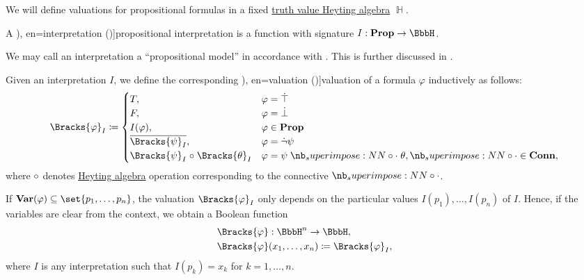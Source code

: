 \begin{definition}\label{def:propositional_valuation}\mimprovised
  We will define valuations for propositional formulas in a fixed \hyperref[con:truth_value_algebra]{truth value Heyting algebra} \( \BbbH \).

  \begin{thmenum}
     A \term[ru=интерпретация (\cite[17]{Герасимов2011Вычислимость}), en=interpretation (\cite[10]{Smullyan1995FOL})]{propositional interpretation} is a function with signature \( I: \op*{Prop} \to \BbbH \).

    We may call an interpretation a \enquote{propositional model} in accordance with . This is further discussed in .

     Given an interpretation \( I \), we define the corresponding \term[ru=значение истинности (формулы) (\cite[8]{Эдельман1975Логика}), en=valuation (\cite[10]{Smullyan1995FOL})]{valuation} of a formula \( \varphi \) inductively as follows:
    \begin{equation}\label{eq:def:propositional_valuation/formula_valuation}
      \Bracks{\varphi}_I \coloneqq \begin{cases}
        T,                                         &\varphi = \syntop \\
        F,                                         &\varphi = \synbot \\
        I(\varphi),                                &\varphi \in \op*{Prop} \\
        \oline{\Bracks{\psi}_I},                   &\varphi = \synneg \psi \\
        \Bracks{\psi}_I \relcirc \Bracks{\theta}_I &\varphi = \psi \syncirc \theta, {\syncirc} \in \op*{Conn},
      \end{cases}
    \end{equation}
    where \( \relcirc \) denotes \hyperref[def:heyting_algebra]{Heyting algebra} operation corresponding to the connective \( \syncirc \).

     If \( \op*{Var}(\varphi) \subseteq \set{ p_1, \ldots, p_n } \), the valuation \( \Bracks{\varphi}_I \) only depends on the particular values \( I(p_1), \ldots, I(p_n) \) of \( I \). Hence, if the variables are clear from the context, we obtain a Boolean function
    \begin{equation*}
      \begin{aligned}
        &\Bracks{\varphi}: \BbbH^n \to \BbbH, \\
        &\Bracks{\varphi}(x_1, \ldots, x_n) \coloneqq \Bracks{\varphi}_I,
      \end{aligned}
    \end{equation*}
    where \( I \) is any interpretation such that \( I(p_k) = x_k \) for \( k = 1, \ldots, n \).


\end{thmenum}
\end{definition}
